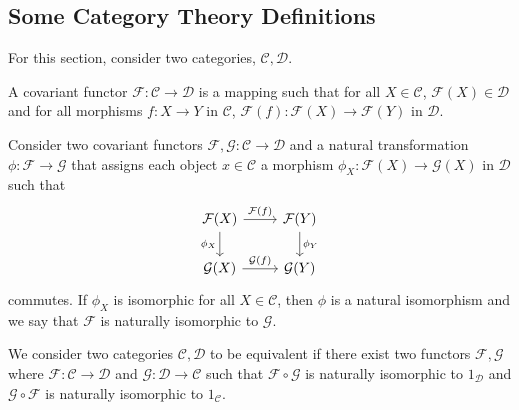\documentclass[10pt,a4paper]{report}
\begin{document}
\subsection*{Some Category Theory Definitions}
	For this section, consider two categories, $\mathcal{C},\mathcal{D}$.
	
	A covariant functor $\mathcal{F}:\mathcal{C}\to\mathcal{D}$ is a mapping such that for all $X\in \mathcal{C}$, $\mathcal{F}(X)\in\mathcal{D}$ and for all morphisms $f:X\to Y$ in $\mathcal{C}$, $\mathcal{F}(f):\mathcal{F}(X)\to\mathcal{F}(Y)$ in $\mathcal{D}$. 
	
	Consider two covariant functors $\mathcal{F},\mathcal{G}:\mathcal{C}\to\mathcal{D}$ and a natural transformation $\phi:\mathcal{F}\to\mathcal{G}$ that assigns each object $x\in\mathcal{C}$ a morphism $\phi_{X}:\mathcal{F}(X)\to\mathcal{G}(X)$ in $\mathcal{D}$ such that 
	\[
		\begin{tikzcd}
		\mathcal{F}(X) \arrow[r,"\mathcal{F}(f)"] \arrow[d,swap,"\phi_{X}"] & \mathcal{F}(Y) \arrow[d,"\phi_{Y}"] \\
		\mathcal{G}(X) \arrow[r,"\mathcal{G}(f)"] & \mathcal{G}(Y)
		\end{tikzcd}
	\]
commutes. If $\phi_{X}$ is isomorphic for all $X\in\mathcal{C}$, then $\phi$ is a natural isomorphism and we say that $\mathcal{F}$ is naturally isomorphic to $\mathcal{G}$. 

	We consider two categories $\mathcal{C},\mathcal{D}$ to be equivalent if there exist two functors $\mathcal{F}, \mathcal{G}$ where $\mathcal{F}:\mathcal{C}\to \mathcal{D}$ and $\mathcal{G}:\mathcal{D}\to\mathcal{C}$ such that $\mathcal{F}\circ\mathcal{G}$ is naturally isomorphic to $1_{\mathcal{D}}$ and $\mathcal{G}\circ\mathcal{F}$ is naturally isomorphic to $1_{\mathcal{C}}$.
\end{document}
